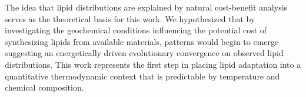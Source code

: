 The idea that lipid distributions are explained by natural cost-benefit analysis serves as the theoretical basis for this work. We hypothesized that by investigating the geochemical conditions influencing the potential cost of synthesizing lipids from available materials, patterns would begin to emerge suggesting an energetically driven evolutionary convergence on observed lipid distributions. This work represents the first step in placing lipid adaptation into a quantitative thermodynamic context that is predictable by temperature and chemical composition.

